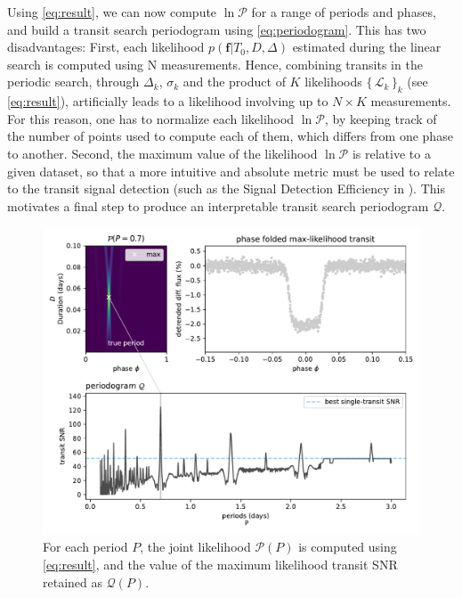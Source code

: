 \documentclass[modern,linenumbers]{aastex631}
\newcommand{\set}[1]{\{\,#1\,\}}
\begin{document}
Using \autoref{eq:result}, we can now compute $\ln\mathcal{P}$ for a range of periods and phases, and build a transit search periodogram using \autoref{eq:periodogram}. This has two disadvantages: First, each likelihood $p(\bm{f} \vert T_0, D, \Delta)$ estimated during the linear search is computed using N measurements. Hence, combining transits in the periodic search, through $\Delta_k$, $\sigma_k$ and the product of $K$ likelihoods $\set{\mathcal{L}_k}_k$ (see \autoref{eq:result}), artificially leads to a likelihood involving up to $N\times K$ measurements. For this reason, one has to normalize each likelihood $\ln\mathcal{P}$, by keeping track of the number of points used to compute each of them, which differs from one phase to another. Second, the maximum value of the likelihood $\ln\mathcal{P}$ is relative to a given dataset, so that a more intuitive and absolute metric must be used to relate to the transit signal detection (such as the Signal Detection Efficiency in \citealt{bls}). This motivates a final step to produce an interpretable transit search periodogram $\mathcal{Q}$. 
\begin{figure}[H]
    \begin{centering}
        \includegraphics[width=\linewidth]{../workflows/principle/figures/principle_Q.pdf}
        \caption{For each period $P$, the joint likelihood $\mathcal{P}(P)$ is computed using \autoref{eq:result}, and the value of the maximum likelihood transit SNR retained as $\mathcal{Q}(P)$.}
        \label{fig:periodogram}
    \end{centering}
\end{figure}
\end{document}
